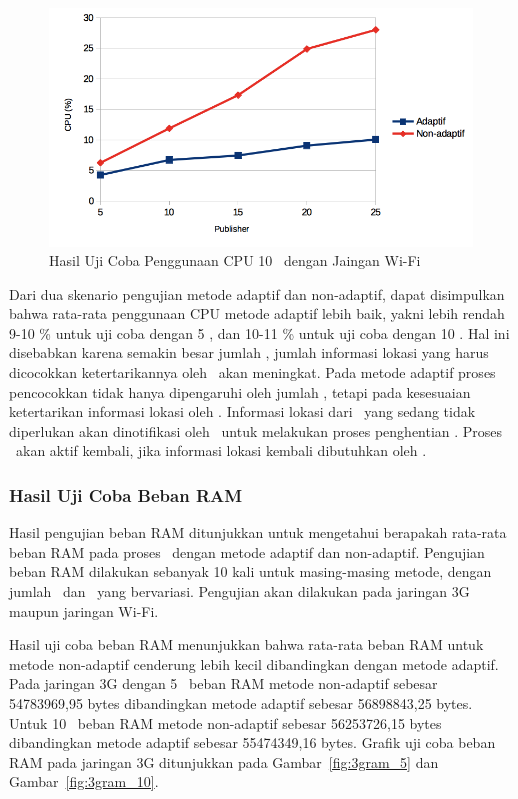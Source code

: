\begin{figure}
  \centering
  \includegraphics[scale=0.90]
	{images/4-cpu10.png}
	\caption{Hasil Uji Coba Penggunaan CPU 10 \Subscriber~dengan Jaingan Wi-Fi}
\label{fig:cpu_10}
\end{figure}

Dari dua skenario pengujian metode adaptif dan non-adaptif, dapat disimpulkan
bahwa rata-rata penggunaan CPU metode adaptif lebih baik, yakni lebih rendah
9-10 \% untuk uji coba dengan 5 \subscriber, dan 10-11 \% untuk uji coba dengan
10 \subscriber. Hal ini disebabkan karena semakin besar jumlah \publisher,
jumlah informasi lokasi yang harus dicocokkan ketertarikannya oleh \broker~akan
meningkat.  Pada metode adaptif proses pencocokkan tidak hanya dipengaruhi oleh
jumlah \publisher, tetapi pada kesesuaian ketertarikan informasi lokasi oleh
\subscriber. Informasi lokasi dari \publisher~yang sedang tidak diperlukan akan
dinotifikasi oleh \broker~untuk melakukan proses penghentian \publish. Proses
\publish~akan aktif kembali, jika informasi lokasi kembali dibutuhkan oleh
\subscriber.


\subsubsection{Hasil Uji Coba Beban RAM}

Hasil pengujian beban RAM ditunjukkan untuk mengetahui berapakah rata-rata
beban RAM pada proses \tracking~dengan metode adaptif dan non-adaptif. Pengujian
beban RAM dilakukan sebanyak 10 kali untuk masing-masing metode, dengan jumlah
\publisher~dan \subscriber~yang bervariasi. Pengujian akan dilakukan pada
jaringan 3G maupun jaringan Wi-Fi.

Hasil uji coba beban RAM menunjukkan bahwa rata-rata beban RAM untuk metode
non-adaptif cenderung lebih kecil dibandingkan dengan metode adaptif. Pada
jaringan 3G dengan 5 \subscriber~beban RAM metode non-adaptif sebesar
54783969,95 bytes dibandingkan metode adaptif sebesar 56898843,25 bytes. Untuk
10 \subscriber~beban RAM metode non-adaptif sebesar 56253726,15 bytes
dibandingkan metode adaptif sebesar 55474349,16 bytes. Grafik uji coba beban RAM
pada jaringan 3G ditunjukkan pada Gambar~\ref{fig:3gram_5} dan
Gambar~\ref{fig:3gram_10}.

